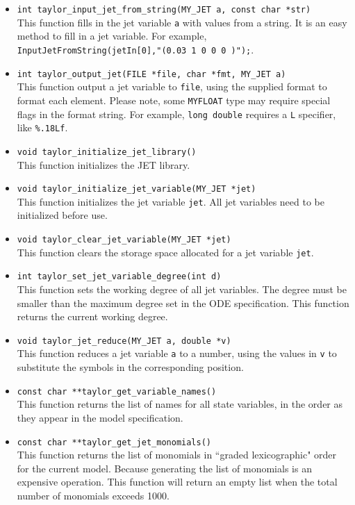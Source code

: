 \documentclass[10pt]{article}
\theoremstyle{remark}
\newcommand{\myfloat}{{\tt MY\symbol{95}FLOAT}}
\begin{document}
\begin{itemize}
\item{\verb+int taylor_input_jet_from_string(MY_JET a, const char *str)+\\
    This function fills in the jet variable \verb+a+ with values from
    a string. It is an easy method to fill in a jet variable. For
    example, \verb+InputJetFromString(jetIn[0],"(0.03 1 0 0 0 )");+.}
    
\item \verb+int taylor_output_jet(FILE *file, char *fmt, MY_JET a)+\\
    This function output a jet variable to \verb+file+, using the
    supplied format to format each element. Please note, some
    \myfloat{} type may require special flags in the format
    string. For example, \verb+long double+ requires a \verb+L+
    specifier, like \verb+%.18Lf+.

\item{\verb+void taylor_initialize_jet_library()+\\    
    This function initializes the JET library. }
    
\item{\verb+void taylor_initialize_jet_variable(MY_JET *jet)+\\
    This function initializes the jet variable \verb+jet+. All jet
    variables need to be initialized before use.}
    
\item{\verb+void taylor_clear_jet_variable(MY_JET *jet)+\\
  This function clears the storage space allocated for a jet variable
  \verb+jet+.}
  
\item{\verb+int taylor_set_jet_variable_degree(int d)+\\
    This function sets the working degree of all jet variables.  The
    degree must be smaller than the maximum degree set in the ODE
    specification.  This function returns the current working degree.}
    
\item{\verb+void taylor_jet_reduce(MY_JET a, double *v)+\\
    This function reduces a jet variable \verb+a+ to a number, using
    the values in \verb+v+ to substitute the symbols in the
    corresponding position.}
    
\item{\verb+const char **taylor_get_variable_names()+\\
    This function returns the list of names for all state variables,
    in the order as they appear in the model specification.}
    
\item{\verb+const char **taylor_get_jet_monomials()+\\
    This function returns the list of monomials in ``graded
    lexicographic" order for the current model. Because generating the
    list of monomials is an expensive operation. This function will
    return an empty list when the total number of monomials exceeds
    1000.}
\end{itemize}
\end{document}
